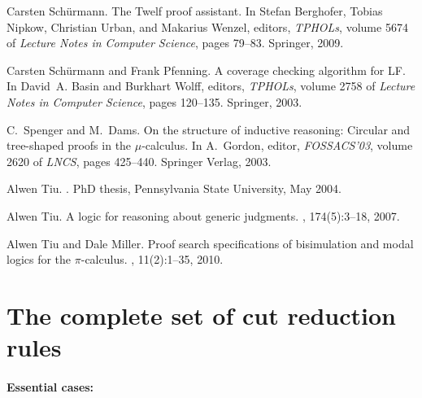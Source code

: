\documentclass[preprint]{elsarticle}
\begin{document}
\begin{thebibliography}{10}
Carsten Sch{\"u}rmann.
\newblock The {Twelf} proof assistant.
\newblock In Stefan Berghofer, Tobias Nipkow, Christian Urban, and Makarius
  Wenzel, editors, {\em TPHOLs}, volume 5674 of {\em Lecture Notes in Computer
  Science}, pages 79--83. Springer, 2009.

Carsten Sch{\"u}rmann and Frank Pfenning.
\newblock A coverage checking algorithm for {LF}.
\newblock In David~A. Basin and Burkhart Wolff, editors, {\em TPHOLs}, volume
  2758 of {\em Lecture Notes in Computer Science}, pages 120--135. Springer,
  2003.

C.~Spenger and M.~Dams.
\newblock On the structure of inductive reasoning: Circular and tree-shaped
  proofs in the $\mu$-calculus.
\newblock In A.~Gordon, editor, {\em FOSSACS'03}, volume 2620 of {\em LNCS},
  pages 425--440. Springer Verlag, 2003.

Alwen Tiu.
.
\newblock PhD thesis, Pennsylvania State University, May 2004.

Alwen Tiu.
\newblock A logic for reasoning about generic judgments.
, 174(5):3--18, 2007.

Alwen Tiu and Dale Miller.
\newblock Proof search specifications of bisimulation and modal logics for the
  {$\pi$}-calculus.
, 11(2):1--35, 2010.

\end{thebibliography}

\appendix

\section{The complete set of cut reduction rules}
\label{app:reduc}

\paragraph{Essential cases:}
\end{document}
